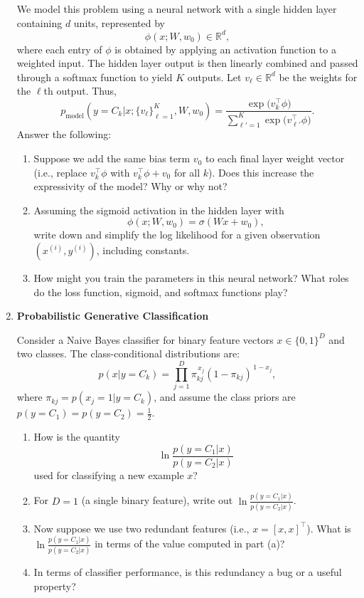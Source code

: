\documentclass{article}
\begin{document}
\begin{enumerate}[label=\textbf{\arabic*.}]
    We model this problem using a neural network with a single hidden layer containing $d$ units, represented by
    \[
    \phi(x;W,w_0)\in\mathbb{R}^d,
    \]
    where each entry of $\phi$ is obtained by applying an activation function to a weighted input. The hidden layer output is then linearly combined and passed through a softmax function to yield $K$ outputs. Let $v_\ell\in\mathbb{R}^d$ be the weights for the $\ell$th output. Thus,
    \[
    p_{\text{model}}(y=C_k|x;\{v_\ell\}_{\ell=1}^K,W,w_0)=\frac{\exp\bigl(v_k^\top\phi\bigr)}{\sum_{\ell'=1}^K\exp\bigl(v_{\ell'}^\top\phi\bigr)}.
    \]
    Answer the following:
    \begin{enumerate}[label=(\alph*)]
        \item Suppose we add the same bias term $v_0$ to each final layer weight vector (i.e., replace $v_k^\top\phi$ with $v_k^\top\phi+v_0$ for all $k$). Does this increase the expressivity of the model? Why or why not?
        \item Assuming the sigmoid activation in the hidden layer with
        \[
        \phi(x;W,w_0)=\sigma(Wx+w_0),
        \]
        write down and simplify the log likelihood for a given observation $(x^{(i)},y^{(i)})$, including constants.
        \item How might you train the parameters in this neural network? What roles do the loss function, sigmoid, and softmax functions play?
    \end{enumerate}

    \item \textbf{Probabilistic Generative Classification}

    Consider a Naive Bayes classifier for binary feature vectors $x\in\{0,1\}^D$ and two classes. The class-conditional distributions are:
    \[
    p(x|y=C_k)=\prod_{j=1}^D \pi_{kj}^{\,x_j}(1-\pi_{kj})^{\,1-x_j},
    \]
    where $\pi_{kj}=p(x_j=1|y=C_k)$, and assume the class priors are $p(y=C_1)=p(y=C_2)=\frac{1}{2}$.
    \begin{enumerate}[label=(\alph*)]
        \item How is the quantity
        \[
        \ln\frac{p(y=C_1|x)}{p(y=C_2|x)}
        \]
        used for classifying a new example $x$?
        \item For $D=1$ (a single binary feature), write out $\ln\frac{p(y=C_1|x)}{p(y=C_2|x)}$.
        \item Now suppose we use two redundant features (i.e., $x=[x,x]^\top$). What is $\ln\frac{p(y=C_1|x)}{p(y=C_2|x)}$ in terms of the value computed in part (a)?
        \item In terms of classifier performance, is this redundancy a bug or a useful property?
    \end{enumerate}


\end{enumerate}
\end{document}
